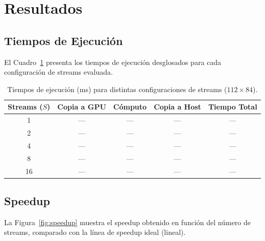 \documentclass[12pt, a4paper]{article}
\begin{document}

\section{Resultados}

\subsection{Tiempos de Ejecución}

El Cuadro~\ref{tab:tiempos} presenta los tiempos de ejecución desglosados
para cada configuración de streams evaluada.

\begin{table}[H]
    \centering
    \caption{Tiempos de ejecución (ms) para distintas configuraciones de
    streams ($112 \times 84$).}
    \label{tab:tiempos}
    \begin{tabular}{ccccc}
        \toprule
        \textbf{Streams ($S$)} &
        \textbf{Copia a GPU} &
        \textbf{Cómputo} &
        \textbf{Copia a Host} &
        \textbf{Tiempo Total} \\
        \midrule
        1  & --- & --- & --- & --- \\
        2  & --- & --- & --- & --- \\
        4  & --- & --- & --- & --- \\
        8  & --- & --- & --- & --- \\
        16 & --- & --- & --- & --- \\
        \bottomrule
    \end{tabular}
\end{table}

\subsection{Speedup}

La Figura~\ref{fig:speedup} muestra el speedup obtenido en función del número
de streams, comparado con la línea de speedup ideal (lineal).
\end{document}
